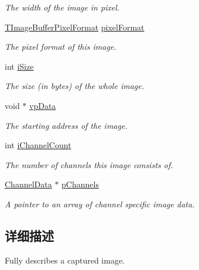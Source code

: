 \begin{DoxyCompactItemize}
\begin{DoxyCompactList}\small\item\em The width of the image in pixel. \end{DoxyCompactList}\item 
\hyperlink{group___common_interface_ga456e8aa76e06bb761f27c52141475985}{T\+Image\+Buffer\+Pixel\+Format} \hyperlink{struct_image_buffer_a18c13011f02db49b05f5f34af314e1b2}{pixel\+Format}
\begin{DoxyCompactList}\small\item\em The pixel format of this image. \end{DoxyCompactList}\item 
int \hyperlink{struct_image_buffer_a694d3c3df58d29da2b9741498566f352}{i\+Size}
\begin{DoxyCompactList}\small\item\em The size (in bytes) of the whole image. \end{DoxyCompactList}\item 
void $\ast$ \hyperlink{struct_image_buffer_ab67c9c21d749e786302c848b508e0673}{vp\+Data}
\begin{DoxyCompactList}\small\item\em The starting address of the image. \end{DoxyCompactList}\item 
int \hyperlink{struct_image_buffer_aff3523b865533ee79471454201a5350c}{i\+Channel\+Count}
\begin{DoxyCompactList}\small\item\em The number of channels this image consists of. \end{DoxyCompactList}\item 
\hypertarget{struct_image_buffer_a3e019502761bca451991fcc538dab274}{\hyperlink{struct_channel_data}{Channel\+Data} $\ast$ \hyperlink{struct_image_buffer_a3e019502761bca451991fcc538dab274}{p\+Channels}}\label{struct_image_buffer_a3e019502761bca451991fcc538dab274}

\begin{DoxyCompactList}\small\item\em A pointer to an array of channel specific image data. \end{DoxyCompactList}\end{DoxyCompactItemize}


\subsection{详细描述}
Fully describes a captured image. 

